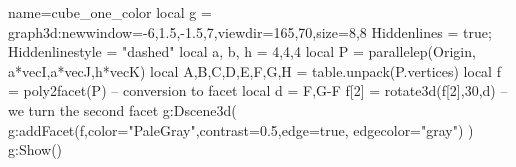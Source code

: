 \documentclass[12pt]{standalone}
\begin{document}
 \begin{luadraw}{name=cube_one_color}
local g = graph3d:new{window={-6,1.5,-1.5,7},viewdir={165,70},size={8,8}}
Hiddenlines = true; Hiddenlinestyle = "dashed"
local a, b, h = 4,4,4
local P = parallelep(Origin, a*vecI,a*vecJ,h*vecK)
local A,B,C,D,E,F,G,H = table.unpack(P.vertices)
local f = poly2facet(P) -- conversion to facet
local d = {F,G-F}
f[2] = rotate3d(f[2],30,d) -- we turn the second facet
g:Dscene3d( g:addFacet(f,{color="PaleGray",contrast=0.5,edge=true, edgecolor="gray"}) )
g:Show()
\end{luadraw}
\end{document}
